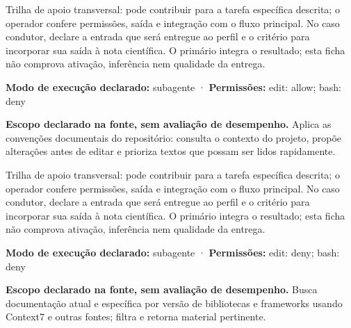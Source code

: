 \begin{funcao}
Trilha de apoio transversal: pode contribuir para a tarefa específica descrita; o operador confere permissões, saída e integração com o fluxo principal. No caso condutor, declare a entrada que será entregue ao perfil e o critério para incorporar sua saída à nota científica. O primário integra o resultado; esta ficha não comprova ativação, inferência nem qualidade da entrega.
\end{funcao}

\begin{arquitetura}
\textbf{Modo de execução declarado:} subagente · \textbf{Permissões:} edit: allow; bash: deny
\end{arquitetura}


\begin{descricao}
\textbf{Escopo declarado na fonte, sem avaliação de desempenho.}
Aplica as convenções documentais do repositório: consulta o contexto do projeto, propõe alterações antes de editar e prioriza textos que possam ser lidos rapidamente.
\end{descricao}

\begin{funcao}
Trilha de apoio transversal: pode contribuir para a tarefa específica descrita; o operador confere permissões, saída e integração com o fluxo principal. No caso condutor, declare a entrada que será entregue ao perfil e o critério para incorporar sua saída à nota científica. O primário integra o resultado; esta ficha não comprova ativação, inferência nem qualidade da entrega.
\end{funcao}

\begin{arquitetura}
\textbf{Modo de execução declarado:} subagente · \textbf{Permissões:} edit: deny; bash: deny
\end{arquitetura}


\begin{descricao}
\textbf{Escopo declarado na fonte, sem avaliação de desempenho.}
Busca documentação atual e específica por versão de bibliotecas e frameworks usando Context7 e outras fontes; filtra e retorna material pertinente.
\end{descricao}

